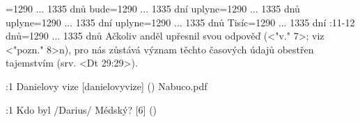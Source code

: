 ={1290 ... 1335 dnů}      %
    {bude}={1290 ... 1335 dní}      %
    {uplyne}={1290 ... 1335 dnů}    %
    {uplyne}={1290 ... 1335 dní}    %
    {uplyne}={1290 ... 1335 dnů}    %
    {Tisíc}={1290 ... 1335 dní}     %
:11-12 {dnů}={1290 ... 1335 dnů} Ačkoliv anděl upřesnil svou odpověď (<"v." 7>; viz <"pozn." 8>n), pro nás zůstává význam těchto časových údajů obestřen tajemstvím (srv. <Dt 29:29>).



:1 {Danielovy vize} [danielovyvize] () {Nabuco.pdf}

:1 {Kdo byl \x/Darius/ Médský?} [6] ()



\endinput

\ww {}  %
    {} %
    {}  %
    {} %
    {}  %
    {}  %
\ww {}={}  %
    {}={}  %
    {}={}   %
    {}={}  %
    {}={}   %
    {}={}   %
    
\Note 12:1 {}={}  \x// (<"">) (<"">) 

 >> Ptolemaios II Filadelfos incest s Arsinou II
 >> Ptolemaios III Euergetes rozvedl z Láodikou, oženil s Berenikou
 >> Ptolemaios IV? Filopator
 >> Ptolemaios V == Kleopatra III
 >> Ptolemaios VI
 >> Kleopatry III  
 >> Ptolemaios IX Soter  (Ptolemaios X jeho brácha) syn Kleopatry III + Ptolemaia VIII  
 >> Ptolemaios XII 
 >> Kleopatra VII

